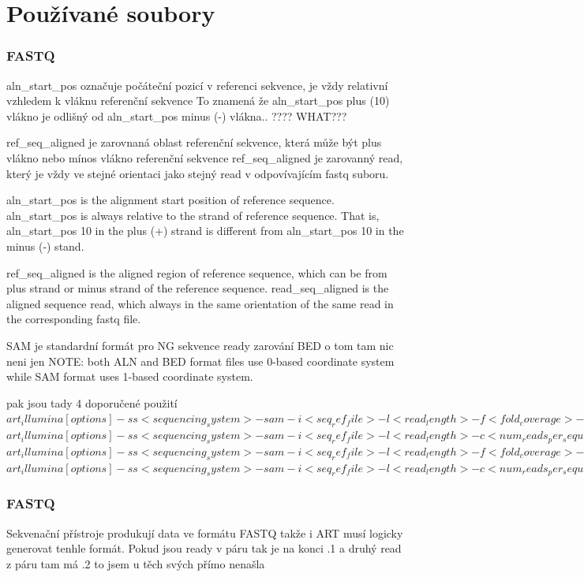 \documentclass[czech,DP]{thesiskiv}
\numberwithin{equation}{section}
\begin{document}
\chapter{Používané soubory}
\subsection{FASTQ}

	    
	    aln\_start\_pos označuje počáteční pozicí v referenci sekvence, je vždy relativní vzhledem k vláknu referenční sekvence
	    To znamená že aln\_start\_pos plus (10) vlákno je odlišný od  aln\_start\_pos minus (-) vlákna.. ???? WHAT???
	    
		ref\_seq\_aligned je zarovnaná oblast referenční sekvence, která může být plus vlákno nebo mínos vlákno referenční sekvence
		ref\_seq\_aligned je zarovanný read, který je vždy ve stejné orientaci jako stejný read v odpovívajícím fastq suboru.  
		
		
			    
	    
	       	
		aln\_start\_pos is the alignment start position of reference sequence. aln\_start\_pos is always relative to the strand of reference sequence. That is, aln\_start\_pos 10 in the plus (+) strand is different from aln\_start\_pos 10 in the minus (‐) stand.  
	
		ref\_seq\_aligned is the aligned region of reference sequence, which can be from plus strand or minus strand of the reference sequence. 
		read\_seq\_aligned is the aligned sequence read, which always in the same orientation of the same read in the corresponding fastq file. 

SAM je standardní formát pro NG sekvence ready zarování
BED o tom tam nic neni jen 
NOTE: both ALN and BED format files use 0-based coordinate system while SAM format uses 1-based coordinate system.

pak jsou tady 4 doporučené použití
$art_illumina [options] -ss <sequencing_system> -sam -i <seq_ref_file> -l <read_length> -f <fold_coverage> -o <outfile_prefix>$
$art_illumina [options] -ss <sequencing_system> -sam -i <seq_ref_file> -l <read_length> -c <num_reads_per_sequence> -o <outfile_prefix>$
$art_illumina [options] -ss <sequencing_system> -sam -i <seq_ref_file> -l <read_length> -f <fold_coverage> -m <mean_fragsize> -s <std_fragsize> -o <outfile_prefix>$
$art_illumina [options] -ss <sequencing_system> -sam -i <seq_ref_file> -l <read_length> -c <num_reads_per_sequence> -m <mean_fragsize> -s <std_fragsize> -o <outfile_prefix>$
\subsection{FASTQ}
Sekvenační přístroje produkují data ve formátu FASTQ takže i ART musí logicky generovat tenhle formát.
Pokud jsou ready v páru tak je na konci .1
a druhý read z páru tam má .2 to jsem u těch svých přímo nenašla 
\end{document}

